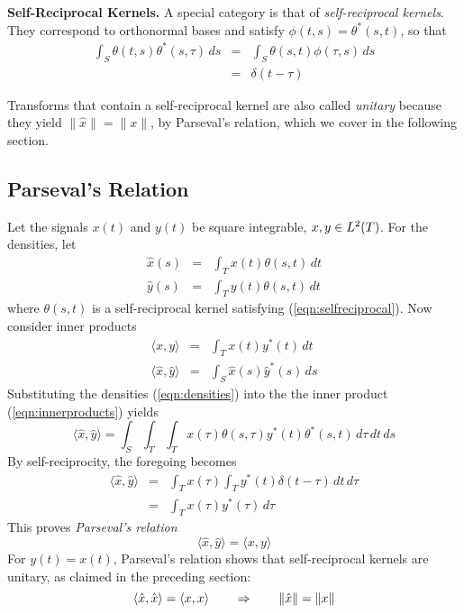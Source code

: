\begin{define}{\bf Self-Reciprocal Kernels. } A special category is that of
\emph{self-reciprocal kernels}.  They correspond to orthonormal bases and
satisfy $\phi(t,s) = \theta^*(s,t)$, so that
\begin{eqnarray}
\label{eqn:selfreciprocal}
\int_S \theta(t,s)\theta^*(s,\tau)\,ds&=& \int_S \theta(s,t)\phi(\tau,s)\,ds\\
&=&\delta(t-\tau) \nonumber
\end{eqnarray}
\end{define}
Transforms that contain a self-reciprocal kernel are also called {\it unitary}
because they yield $\|\hat{x}\| = \|x\|$, by Parseval's relation, which we
cover in the following section.

{\subsection{Parseval's Relation\protect\footnotemark}
}
\label{sec:Parseval}
Let the signals $x(t)$ and $y(t)$ be square integrable, $x,y \in L^2(T)$.
For the densities, let
\begin{eqnarray}
\hat{x}(s) &=& \int_T x(t) \theta(s,t) \,dt\nonumber \\
\label{eqn:densities}
\hat{y}(s) &=& \int_T y(t) \theta(s,t) \,dt
\end{eqnarray}
where $\theta(s,t)$ is a self-reciprocal kernel satisfying
(\ref{eqn:selfreciprocal}). 
Now consider inner products
\begin{eqnarray}
  \langle x,y\rangle &= &\int_T x(t)y^*(t)\,dt\nonumber \\
\label{eqn:innerproducts} 
  \langle \hat{x},\hat{y}\rangle &= & \int_S \hat{x}(s)\hat{y}^*(s)\,ds 
\end{eqnarray}
Substituting the densities (\ref{eqn:densities}) into the the inner product
(\ref{eqn:innerproducts}) yields
\[ 
  \langle \hat{x},\hat{y}\rangle =
  \int_S \int_T \int_T x(\tau)\theta(s,\tau) y^*(t) \theta^*(s,t) \,d\tau \,dt \,ds
\] 
By self-reciprocity, the foregoing becomes
\begin{eqnarray*}
  \langle \hat{x},\hat{y}\rangle &=&
  \int_T x(\tau)\int_T y^*(t) \delta(t-\tau) \,dt \,d\tau\\
&=&  \int_T x(\tau) y^*(\tau) \,d\tau
\end{eqnarray*}
This proves {\it Parseval's relation}
\[ 
  \langle \hat{x},\hat{y}\rangle =   \langle x,y\rangle 
\]
For $y(t)=x(t)$, Parseval's relation shows that self-reciprocal
kernels are unitary, as claimed in the preceding section:
\[ 
  \langle \hat{x},\hat{x}\rangle = \langle x,x\rangle 
  \hspace{7mm} \Rightarrow \hspace{7mm} \|\hat{x}\|=\|x\|
\]

